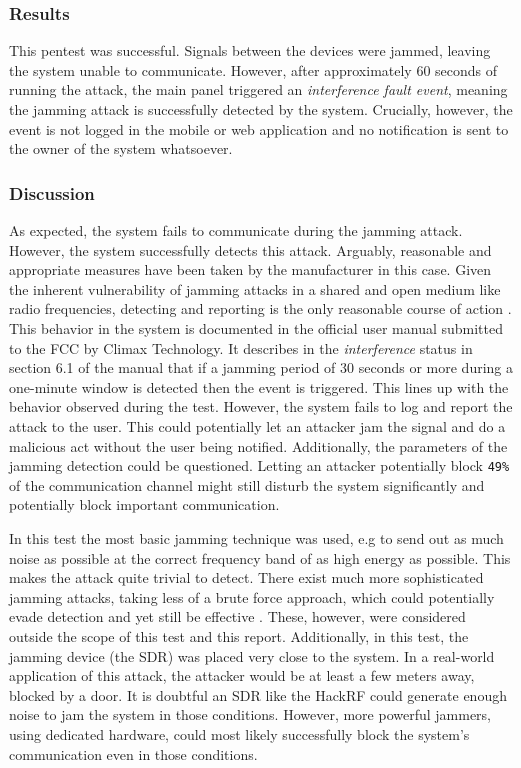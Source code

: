 \subsubsection{Results}
This pentest was successful. Signals between the devices were jammed, leaving the system unable to communicate. However, after approximately 60 seconds of running the attack, the main panel triggered an \textit{interference fault event}, meaning the jamming attack is successfully detected by the system. Crucially, however, the event is not logged in the mobile or web application and no notification is sent to the owner of the system whatsoever.

\subsubsection{Discussion}
As expected, the system fails to communicate during the jamming attack. However, the system successfully detects this attack. Arguably, reasonable and appropriate measures have been taken by the manufacturer in this case. Given the inherent vulnerability of jamming attacks in a shared and open medium like radio frequencies, detecting and reporting is the only reasonable course of action 
\cite{optimal-jamming-defense}. This behavior in the system is documented in the official user manual submitted to the FCC \cite{hsgw-user-manual} by Climax Technology. It describes in the \textit{interference} status in section 6.1 of the manual that if a jamming period of 30 seconds or more during a one-minute window is detected then the event is triggered. This lines up with the behavior observed during the test. However, the system fails to log and report the attack to the user. This could potentially let an attacker jam the signal and do a malicious act without the user being notified. Additionally, the parameters of the jamming detection could be questioned. Letting an attacker potentially block \texttt{49\%} of the communication channel might still disturb the system significantly and potentially block important communication.

In this test the most basic jamming technique was used, e.g to send out as much noise as possible at the correct frequency band of as high energy as possible. This makes the attack quite trivial to detect. There exist much more sophisticated jamming attacks, taking less of a brute force approach, which could potentially evade detection and yet still be effective \cite{mpitziopoulos2009survey}. These, however, were considered outside the scope of this test and this report. Additionally, in this test, the jamming device (the SDR) was placed very close to the system. In a real-world application of this attack, the attacker would be at least a few meters away, blocked by a door. It is doubtful an SDR like the HackRF could generate enough noise to jam the system in those conditions. However, more powerful jammers, using dedicated hardware, could most likely successfully block the system's communication even in those conditions.
